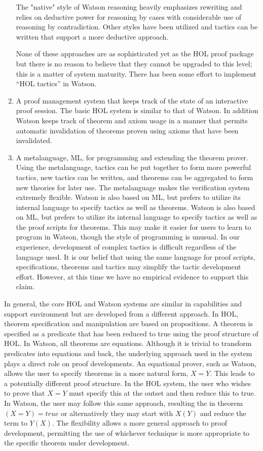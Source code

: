\documentclass{kluwer}
\begin{document}
\begin{article}
\begin{enumerate}
The "native" style of Watson reasoning heavily emphasizes rewriting 
and relies on deductive power for reasoning by cases with considerable use
of reasoning by contradiction. Other styles have been utilized and tactics can be written
that support a more deductive approach.

None of these approaches are as sophisticated yet as the HOL proof package but
there is no reason to believe that they cannot be upgraded to this
level; this is a matter of system maturity. There has been some effort
to implement ``HOL tactics'' in Watson.


\item
A proof management system that keeps track of the state of an
interactive proof session. The basic HOL system is similar to that of
Watson. In addition Watson keeps track of theorem and axiom usage in a
manner that permits automatic invalidation of theorems proven using
axioms that have been invalidated.
\item
A metalanguage, ML, for programming and extending the theorem prover.
Using the metalanguage, tactics can be put together to form more
powerful tactics, new tactics can be written, and theorems can be
aggregated to form new theories for later use. The metalanguage makes
the verification system extremely flexible. Watson is also based on
ML, but prefers to utilize its internal language to specify tactics as
well as theorems.  Watson is also based on  ML, but prefers to utilize
its internal language to specify tactics as well as the proof scripts
for theorems.  This may make it easier for users to learn to program
in Watson, though the style of programming is unusual. In our
experience, development of complex tactics is difficult regardless of
the language used. It is our belief that using the same language for
proof scripts, specifications, theorems and tactics may simplify the
tactic development effort.  However, at this time we have no empirical
evidence to support this claim.


\end{enumerate}

In general, the core HOL and Watson systems are similar in
capabilities and support environment but are developed from a
different approach. In HOL, theorem specification and manipulation are
based on propositions. A theorem is specified as a predicate that has been reduced to true using the proof structure of HOL. In Watson, all
theorems are equations. Although it is trivial to transform predicates into equations and back, the underlying approach used in the system plays a direct role on proof developments. An equational prover, such as Watson, allows the user to specify theorems in a more natural form, $X = Y$. This leads to a potentially different proof structure. In the HOL system, the user who wishes to prove that $X=Y$ must specify this at the outset and then reduce this to true. In Watson, the user may follow this same approach, resulting the in theorem $(X=Y)=true$ or alternatively they may start with $X(Y)$ and reduce the term to $Y(X)$. The flexibility allows a more general approach to proof development, permitting the use of whichever technique is more appropriate to the specific theorem under development.


\end{article}
\end{document}

